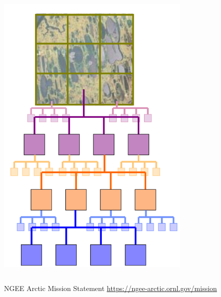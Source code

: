 \documentclass{beamer}
\begin{document}
\begin{frame}
\begin{columns}[T]
\begin{column}{.5\textwidth}
 
    \includegraphics[width=0.7\textwidth]{figs/ngee_scaling.png}
    
   
    \end{column}
  \end{columns}

\footnotesize{NGEE Arctic Mission Statement 
\url{https://ngee-arctic.ornl.gov/mission}}
  
\end{frame}
\end{document}

